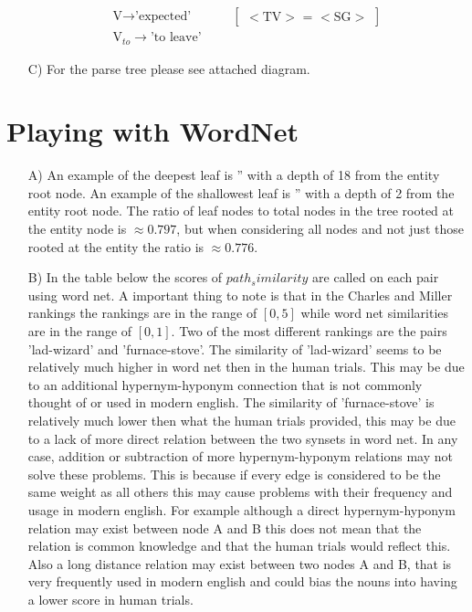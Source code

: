 \documentclass{article}
\begin{document}
\begin{enumerate}
\begin{align*}
\text{V} \rightarrow \text{'expected'} &  & &  \left  [ \begin{array}{c} <\text{TV}>\text{ = } <\text{SG}>  \end{array} \right ] \\
\text{V}_{to} \rightarrow \text{'to leave'} &  & & 
\end{align*}
\item[C)] For the parse tree please see attached diagram.
\end{enumerate}

\section{Playing with WordNet}
\begin{enumerate}
\item[A)] An example of the deepest leaf is '' with a depth of 18 from the entity root node. An example of the shallowest leaf is '' with a depth of 2 from the entity root node. The ratio of leaf nodes to total nodes in the tree rooted at the entity node is $\approx 0.797$, but when considering all nodes and not just those rooted at the entity the ratio is $\approx0.776$.
\item[B)] In the table below the scores of $path_similarity$ are called on each pair using word net. A important thing to note is that in the Charles and Miller rankings the rankings are in the range of $[0,5]$ while word net similarities are in the range of $[0,1]$. Two of the most different rankings are the pairs 'lad-wizard' and 'furnace-stove'. The similarity of 'lad-wizard' seems to be relatively much higher in word net then in the human trials. This may be due to an additional hypernym-hyponym connection that is not commonly thought of or used in modern english. The similarity of 'furnace-stove' is relatively much lower then what the human trials provided, this may be due to a lack of more direct relation between the two synsets in word net. In any case, addition or subtraction of more hypernym-hyponym relations may not solve these problems. This is because if every edge is considered to be the same weight as all others this may cause problems with their frequency and usage in modern english. For example although a direct hypernym-hyponym relation may exist between node A and B this does not mean that the relation is common knowledge and that the human trials would reflect this. Also a long distance relation may exist between two nodes A and B, that is very frequently used in modern english and could bias the nouns into having a lower score in human trials. 

\end{enumerate}
\end{document}
